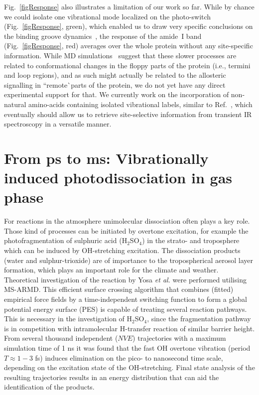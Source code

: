\documentclass[journal=jacsat,manuscript=article]{achemso}
\begin{document}
Fig.~\ref{figResponse} also illustrates a limitation of our work so
far. While by chance we could isolate one vibrational mode localized
on the photo-switch (Fig.~\ref{figResponse}, green), which enabled us
to draw very specific conclusions on the binding groove
dynamics~\cite{buchli13,waldauer14}, the response of the amide~I band
(Fig.~\ref{figResponse}, red) averages over the whole protein without
any site-specific information. While MD
simulations~\cite{buchenberg14} suggest that these slower processes
are related to conformational changes in the floppy parts of the
protein (i.e., termini and loop regions), and as such might actually
be related to the allosteric signalling in ``remote^^ parts of the
protein, we do not yet have any direct experimental support for
that. We currently work on the incorporation of non-natural
amino-acids containing isolated vibrational labels, similar to
Ref.~\cite{bloem12}, which eventually should allow us to retrieve
site-selective information from transient IR spectroscopy in a
versatile manner.








\section{From ps to ms: Vibrationally induced photodissociation in gas phase} 
\label{sec:vibphotodis} 
For reactions in the atmosphere unimolecular dissociation often plays
a key role. Those kind of processes can be initiated by overtone
excitation, for example the photofragmentation of sulphuric acid
(H$_2$SO$_4$) in the strato- and troposphere which can be induced by
OH-stretching excitation. The dissociation products (water and
sulphur-trioxide) are of importance to the tropospherical aerosol
layer formation, which plays an important role for the climate and
weather\cite{vaida.sci.2003.vibphotodis}.\\

\noindent 
Theoretical investigation of the reaction by Yosa \textit{et
  al.}\cite{reyes.pccp.2014.msarmd} were performed utilising
MS-ARMD\cite{nagy.jctc.2014.msarmd}. This efficient surface crossing
algorithm that combines (fitted) empirical force fields by a
time-independent switching function to form a global potential energy
surface (PES) is capable of treating several reaction pathways. This
is necessary in the investigation of H$_2$SO$_4$, since the
fragmentation pathway is in competition with intramolecular H-transfer
reaction of similar barrier height. From several thousand independent
($NVE$) trajectories with a maximum simulation time of 1 ns it was
found that the fast OH overtone vibration (period $T \approx 1-3$ fs)
induces elimination on the pico- to nanosecond time scale, depending
on the excitation state of the OH-stretching. Final state analysis of
the resulting trajectories results in an energy distribution that can
aid the identification of the products.\\
\end{document}

